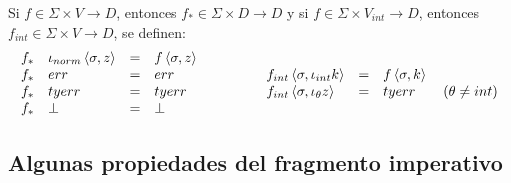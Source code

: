   \vspace{5mm}
  \PN Si $f \in \Sigma\times V\rightarrow D$, entonces $f_* \in \Sigma\times D \rightarrow D$ y
  \PN si $f \in \Sigma\times V_{int}\rightarrow D$, entonces $f_{int} \in \Sigma\times V \rightarrow D$, se definen:
  \[\begin{array}{lllllllllll}
    f_* & \iota_{norm}\left\langle \sigma,z\right\rangle &=& f \left\langle\sigma,z\right\rangle \\
    f_* & err &=& err & \qquad \qquad f_{int} \left\langle \sigma,\iota_{int} k\right\rangle &=& f \left\langle\sigma,k\right\rangle \\
    f_* & tyerr &=& tyerr & \qquad \qquad f_{int} \left\langle \sigma,\iota_{\theta} z\right\rangle &=& tyerr \qquad(\theta\neq int) \\
    f_* & \bot &=& \bot
  \end{array}\]

  \subsection{Algunas propiedades del fragmento imperativo}
